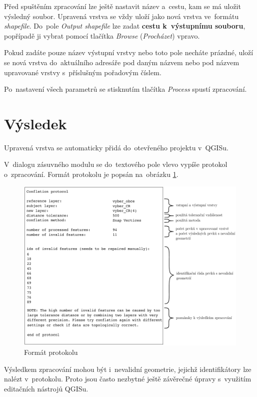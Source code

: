 Před spuštěním zpracování lze ještě nastavit název a~cestu, kam se má uložit
vý\-sledný soubor. Upravená vrstva se vždy uloží jako nová vrstva ve~formátu 
\textit{shapefile}. Do~pole \textit{Output shapefile} lze zadat \textbf{cestu 
k~výstupnímu souboru}, popřípadě ji vybrat pomocí tlačítka \textit{Browse} 
(\textit{Procházet}) vpravo. 

Pokud zadáte pouze název výstupní vrstvy nebo toto pole necháte prázdné, 
uloží se nová vrstva do~aktuálního adresáře pod daným názvem nebo pod názvem
upravované vrstvy s~příslušným pořadovým číslem. 

Po~nastavení všech parametrů se stisknutím tlačítka \textit{Process} 
spustí zpracování. 

\section{Výsledek}
\label{prirucka-vysledek}

Upravená vrstva se automaticky přidá do~otevřeného projektu v~QGISu.

V~dialogu zásuvného modulu se do~textového pole vlevo vypíše protokol o~zpracování.
Formát protokolu je popsán na~obrázku \ref{fig:protokol}.  

  \begin{figure}[H]
    \centering
      \includegraphics[width=420pt]{./pictures/protokol.pdf}
      \caption{Formát protokolu}
      \label{fig:protokol}
  \end{figure} 

Výsledkem zpracování mohou být i~nevalidní geometrie, jejichž identifikátory lze
nalézt v~protokolu. Proto jsou často nezbytné ještě závěrečné úpravy s~využitím
editačních nástrojů QGISu.


